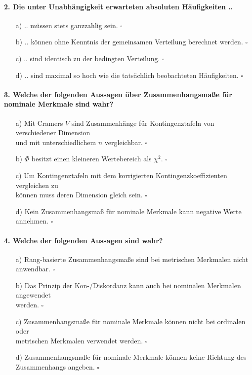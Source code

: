 \documentclass[a4paper]{article}
\begin{document}
\paragraph{2. Die unter Unabhängigkeit erwarteten absoluten Häufigkeiten ..}

\begin{itemize}
    \item[a)] .. müssen stets ganzzahlig sein. \hfill $\square$
    \item[b)] .. können ohne Kenntnis der gemeinsamen Verteilung berechnet werden. \hfill $\square$
    \item[c)] .. sind identisch zu der bedingten Verteilung. \hfill $\square$
    \item[d)] .. sind maximal so hoch wie die tatsächlich beobachteten Häufigkeiten. \hfill $\square$
\end{itemize}

\paragraph{3. Welche der folgenden Aussagen über Zusammenhangsmaße für nominale Merkmale sind wahr?}

\begin{itemize}
    \item[a)] Mit Cramers $V$ sind Zusammenhänge für Kontingenztafeln von verschiedener Dimension\\und mit unterschiedlichem $n$ vergleichbar. \hfill $\square$
    \item[b)] $\Phi$ besitzt einen kleineren Wertebereich als $\chi^2$. \hfill $\square$
    \item[c)] Um Kontingenztafeln mit dem korrigierten Kontingenzkoeffizienten vergleichen zu\\können muss deren Dimension gleich sein. \hfill $\square$
    \item[d)] Kein Zusammenhangsmaß für nominale Merkmale kann negative Werte annehmen. \hfill $\square$
\end{itemize}

\paragraph{4. Welche der folgenden Aussagen sind wahr?}

\begin{itemize}
    \item[a)] Rang-basierte Zusammenhangsmaße sind bei metrischen Merkmalen nicht anwendbar. \hfill $\square$
    \item[b)] Das Prinzip der Kon-/Diskordanz kann auch bei nominalen Merkmalen angewendet\\werden. \hfill $\square$
    \item[c)] Zusammenhangsmaße für nominale Merkmale können nicht bei ordinalen oder\\metrischen Merkmalen verwendet werden. \hfill $\square$
    \item[d)] Zusammenhangsmaße für nominale Merkmale können keine Richtung des\\Zusammenhangs angeben. \hfill $\square$
\end{itemize}
\end{document}
